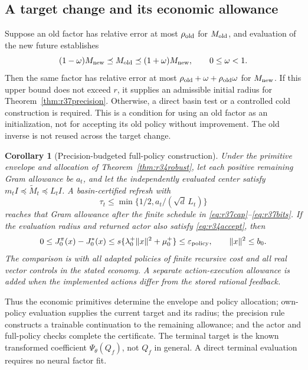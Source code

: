 \documentclass[ecta,nameyear,draft]{econsocart}
\newtheorem{corollary}[theorem]{Corollary}
\theoremstyle{definition}
\theoremstyle{remark}
\begin{document}
\subsection{A target change and its economic allowance}
Suppose an old factor has relative error at most $\rho_{\rm old}$ for
$M_{\rm old}$, and evaluation of the new future establishes
\[
 (1-\omega)M_{\rm new}\preceq M_{\rm old}
                \preceq(1+\omega)M_{\rm new},\qquad 0\leq\omega<1.
\]
Then the same factor has relative error at most
$\rho_{\rm old}+\omega+\rho_{\rm old}\omega$ for $M_{\rm new}$. If
this upper bound does not exceed $r$, it supplies an admissible initial
radius for Theorem~\ref{thm:r37precision}. Otherwise, a direct basin test or
a controlled cold construction is required. This is a condition for using
an old factor as an initialization, not for accepting its old policy without
improvement. The old inverse is not reused across the target change.

\begin{corollary}[Precision-budgeted full-policy construction]
\label{cor:r37policy}
Under the primitive envelope and allocation of
Theorem~\ref{thm:r34robust}, let each positive remaining Gram allowance be
$a_t$, and let the independently evaluated center satisfy
$m_tI\preceq\widetilde M_t\preceq L_tI$. A basin-certified refresh with
\begin{equation}\label{eq:r37economic}
 \tau_t\leq\min\{1/2,a_t/(\sqrt d\,L_t)\}
\end{equation}
reaches that Gram allowance after the finite schedule in
\eqref{eq:r37cap}--\eqref{eq:r37bits}. If the evaluation radius and returned
actor also satisfy \eqref{eq:r34accept}, then
\[
 0\leq J_0^\pi(x)-J_0^*(x)
       \leq s\{\lambda_0^+\|x\|^2+\mu_0^+\}
       \leq\varepsilon_{\rm policy},\qquad \|x\|^2\leq b_0.
\]
The comparison is with all adapted policies of finite recursive cost and all
real vector controls in the stated economy. A separate action-execution
allowance is added when the implemented actions differ from the stored
rational feedback.
\end{corollary}

Thus the economic primitives determine the envelope and policy allocation;
own-policy evaluation supplies the current target and its radius; the
precision rule constructs a trainable continuation to the remaining
allowance; and the actor and full-policy checks complete the certificate.
The terminal target is the known transformed coefficient
$\Psi_\theta(Q_f)$, not $Q_f$ in general. A direct terminal evaluation
requires no neural factor fit.
\end{document}

